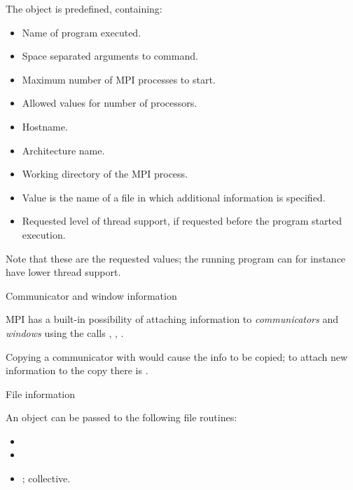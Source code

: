 The object  is predefined, containing:
\begin{itemize}
\item {}
  Name of program executed.
\item  {}
  Space separated arguments to command.
\item  {}
  Maximum number of MPI processes to start.
\item   {}
  Allowed values for number of processors.
\item   {}
  Hostname.
\item   {}
  Architecture name.
\item   {}
  Working directory of the MPI process.
\item   {}
  Value is the name of a file in which additional information is specified.
\item   {}
  Requested level of thread support, if requested before the program started execution.
\end{itemize}
Note that these are the requested values; the running program can for instance
have lower thread support.

 {Communicator and window information}

MPI has a built-in possibility of attaching information to
\emph{communicators}
and
\emph{windows}
using the calls
,
,
.

Copying a communicator with  would cause
the info to be copied; to attach new information to the copy there is
.

 {File information}
\label{sec:mpi-file-info}

An  object can be passed to the following file routines:
\begin{itemize}
\item {}
\item {}
\item {}; collective.
\end{itemize}

